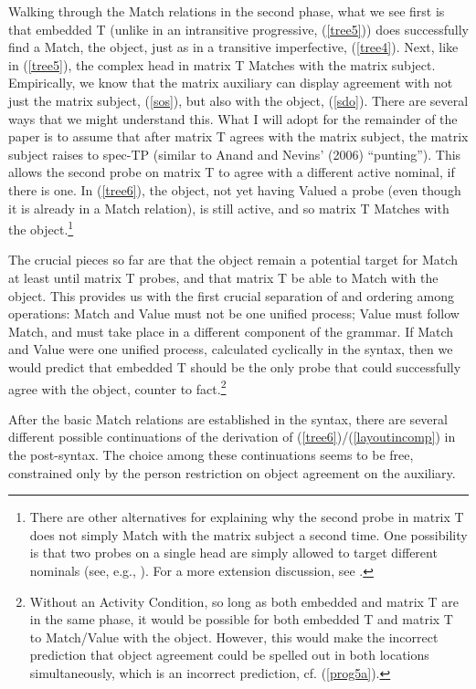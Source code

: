 \documentclass[output=paper
,modfonts
,nonflat]{langsci/langscibook}
\begin{document}
\noindent Walking through the Match relations in the second phase, what we see first is that embedded T (unlike in an intransitive progressive, (\ref{tree5})) does successfully find a Match, the object, just as in a transitive imperfective, (\ref{tree4}). Next, like in (\ref{tree5}), the complex head in matrix T Matches with the matrix subject. Empirically, we know that the matrix auxiliary can display agreement with not just the matrix subject, (\ref{sos}), but also with the object, (\ref{sdo}). There are several ways that we might understand this. What I will adopt for the remainder of the paper is to assume that after matrix T agrees with the matrix subject, the matrix subject raises to spec-TP (similar to Anand and Nevins' (2006) ``punting''). This allows the second probe on matrix T to agree with a different active nominal, if there is one. In (\ref{tree6}), the object, not yet having Valued a probe (even though it is already in a Match relation), is still active, and so matrix T Matches with the object.\footnote{There are other alternatives for explaining why the second probe in matrix T does not simply Match with the matrix subject a second time. One possibility is that two probes on a single head are simply allowed to target different nominals (see, e.g., \citealt{Keine10}).\nocite{AnandNevins06} For a more extension discussion, see \citet[fn. 12]{Georgi12}.} 

The crucial pieces so far are that the object remain a potential target for Match at least until matrix T probes, and that matrix T be able to Match with the object. This provides us with the first crucial separation of and ordering among operations: Match and Value must not be one unified process; Value must follow Match, and must take place in a different component of the grammar. If Match and Value were one unified process, calculated cyclically in the syntax, then we would predict that embedded T should be the only probe that could successfully agree with the object, counter to fact.\footnote{Without an Activity Condition, so long as both embedded and matrix T are in the same phase, it would be possible for both embedded T and matrix T to Match/Value with the object. However, this would make the incorrect prediction that object agreement could be spelled out in both locations simultaneously, which is an incorrect prediction, cf. (\ref{prog5a}).}  

After the basic Match relations are established in the syntax, there are several different possible continuations of the derivation of (\ref{tree6})/(\ref{layoutincomp}) in the post-syntax. The choice among these continuations seems to be free, constrained only by the person restriction on object agreement on the auxiliary. 
\end{document}

